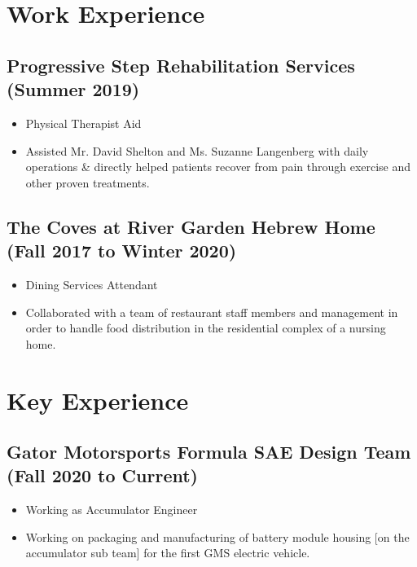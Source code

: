 \documentclass{article}
\newcommand{\sectionspacing}{\vspace{-.4em}} %
\newenvironment{CustomItemize}
{ \begin{itemize}[leftmargin=1em]
    \setlength{\itemsep}{0pt}
    \setlength{\parskip}{0pt}
    \setlength{\parindent}{0pt}
    \setlength{\parsep}{0pt}     }
{ \end{itemize}                  }
\begin{document}

\sectionspacing{}

\section{Work Experience}
\subsection{Progressive Step Rehabilitation Services (Summer 2019)}
\begin{CustomItemize}
\item Physical Therapist Aid
\item Assisted Mr. David Shelton and Ms. Suzanne Langenberg with daily operations \& directly helped patients recover from pain through exercise and other proven treatments.
\end{CustomItemize}

\subsection{The Coves at River Garden Hebrew Home (Fall 2017 to Winter 2020)}
\begin{CustomItemize}
\item Dining Services Attendant
\item Collaborated with a team of restaurant staff members and management in order to handle food distribution in the residential complex of a nursing home.
\end{CustomItemize}

\section{Key Experience}
\subsection{Gator Motorsports Formula SAE Design Team (Fall 2020 to Current)}
\begin{CustomItemize}
\item Working as Accumulator Engineer 
\item Working on packaging and manufacturing of battery module housing [on the accumulator sub team] for the first GMS electric vehicle.
\end{CustomItemize}
\end{document}
